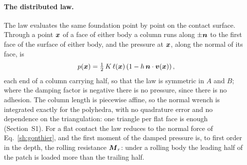 \paragraph{The distributed law.} The law  evaluates the same foundation point
by point on the contact surface. Through a point $\boldsymbol{x}$ of a face of either body a column runs
along $\pm\boldsymbol{n}$ to the first face of the surface of either body, and the pressure at $\boldsymbol{x}$, along
the normal of its face, is
\begin{equation}
  p(\boldsymbol{x}) = \tfrac12\,K\,\ell(\boldsymbol{x})\left(1 - h\,\boldsymbol{n}\cdot\boldsymbol{v}(\boldsymbol{x})\right),
  \label{sh:pressure}
\end{equation}
each end of a column carrying half, so that the law is symmetric in $A$ and $B$; where the
damping factor is negative there is no pressure, since there is no adhesion. The column length
is piecewise affine, so the normal wrench is integrated exactly for the polyhedra, with no
quadrature error and no dependence on the triangulation: one triangle per flat face is enough
(Section~S1). For a flat contact the law reduces to the normal force of
Eq.~\eqref{sh:gonthier}, and the first moment of the damped pressure is, to first order in the
depth, the rolling resistance $\boldsymbol{M}_r$: under a rolling body the leading half of the patch
is loaded more than the trailing half.

